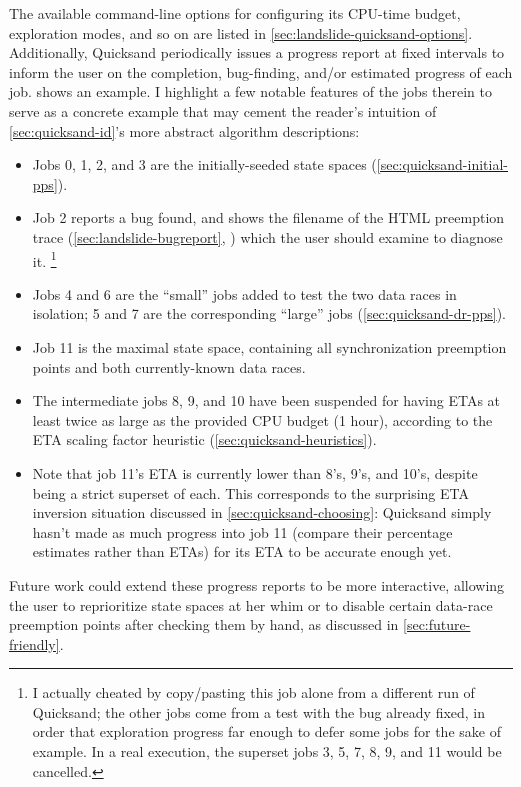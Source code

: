 The available command-line options for configuring its
CPU-time budget, exploration modes, and so on
are listed in \cref{sec:landslide-quicksand-options}.
Additionally, Quicksand periodically issues a progress report
at fixed intervals to inform the user on the completion, bug-finding, and/or estimated progress of each job.
 shows an example.
I highlight a few notable features of the jobs therein
to serve as a concrete example that may cement the reader's intuition
of \cref{sec:quicksand-id}'s more abstract algorithm descriptions:
\begin{itemize}
	\item Jobs 0, 1, 2, and 3 are the initially-seeded state spaces (\cref{sec:quicksand-initial-pps}).
	\item Job 2 reports a bug found, and shows the filename of the HTML preemption trace
		(\cref{sec:landslide-bugreport}, )
		which the user should examine to diagnose it.%
		\footnote{I actually cheated by copy/pasting this job alone from a different run of Quicksand;
		the other jobs come from a test with the bug already fixed,
		in order that exploration progress far enough to defer some jobs for the sake of example.
		In a real execution, the superset jobs 3, 5, 7, 8, 9, and 11 would be cancelled.}
	\item Jobs 4 and 6 are the ``small'' jobs added to test the two data races in isolation;
		5 and 7 are the corresponding ``large'' jobs (\cref{sec:quicksand-dr-pps}).
	\item Job 11 is the maximal state space, containing all synchronization preemption points
		and both currently-known data races.
	\item The intermediate jobs 8, 9, and 10 have been suspended for having ETAs
		at least twice as large as the provided CPU budget (1 hour),
		according to the ETA scaling factor heuristic (\cref{sec:quicksand-heuristics}).
	\item Note that job 11's ETA is currently lower than 8's, 9's, and 10's, despite being a strict superset of each.
		This corresponds to the surprising ETA inversion situation discussed in \cref{sec:quicksand-choosing}:
		Quicksand simply hasn't made as much progress into job 11 (compare their percentage estimates rather than ETAs)
		for its ETA to be accurate enough yet.
\end{itemize}
Future work could extend these progress reports to be more interactive,
allowing the user to reprioritize state spaces at her whim
or to disable certain data-race preemption points after checking them by hand,
as discussed in \cref{sec:future-friendly}.

